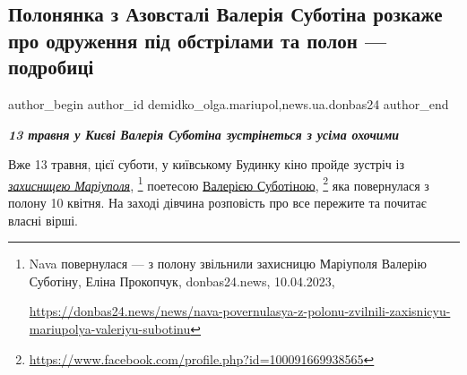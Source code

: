  
 
 
 
 
 
\subsection{Полонянка з Азовсталі Валерія Суботіна розкаже про одруження під обстрілами та полон — подробиці}
\label{sec:10_05_2023.stz.news.ua.donbas24.1.polonjanka_azovstal_valeria_subotina_rozskazhe_odruzhennja_polon}
 
\ifcmt
 author_begin
   author_id demidko_olga.mariupol,news.ua.donbas24
 author_end
\fi


\begin{center}
  \em\color{blue}\bfseries\Large
13 травня у Києві Валерія Суботіна зустрінеться з усіма охочими
\end{center}

Вже 13 травня, цієї суботи, у київському Будинку кіно пройде зустріч із
\href{https://donbas24.news/news/nava-povernulasya-z-polonu-zvilnili-zaxisnicyu-mariupolya-valeriyu-subotinu}{\emph{захисницею Маріуполя}},%
\footnote{Nava повернулася — з полону звільнили захисницю Маріуполя Валерію Суботіну, Еліна Прокопчук, donbas24.news, 10.04.2023, \par\url{https://donbas24.news/news/nava-povernulasya-z-polonu-zvilnili-zaxisnicyu-mariupolya-valeriyu-subotinu}} 
поетесою \href{https://www.facebook.com/profile.php?id=100091669938565}{Валерією Суботіною},%
\footnote{\url{https://www.facebook.com/profile.php?id=100091669938565}} яка повернулася з полону 10 квітня. На заході дівчина розповість про все пережите та почитає власні вірші.

